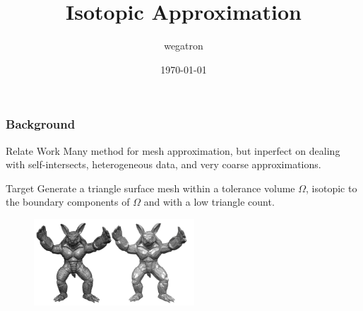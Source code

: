 \documentclass{beamer}
\title[Isotopic Approximation]{Isotopic Approximation} %
\author{wegatron} %
\institute[ZJU] %
{
ZJU\\ %
\medskip
}
\date{\today} %
\begin{document}
\begin{frame}
\titlepage %
\end{frame}

\begin{frame}
\frametitle{Background} %
\tableofcontents %
\begin{block}{Relate Work}
  Many method for mesh approximation, but inperfect on dealing with self-intersects, heterogeneous data, and very coarse approximations.
\end{block}
\begin{block}{Target}
Generate a triangle surface mesh within a tolerance volume $\Omega$, isotopic to the boundary components of $\Omega$ and with a low triangle count.
\end{block}
\begin{example}[Result]
  \begin{figure}[h]
    \includegraphics[width=6cm]{res}
  \end{figure}
\end{example}
\end{frame}
\end{document}
